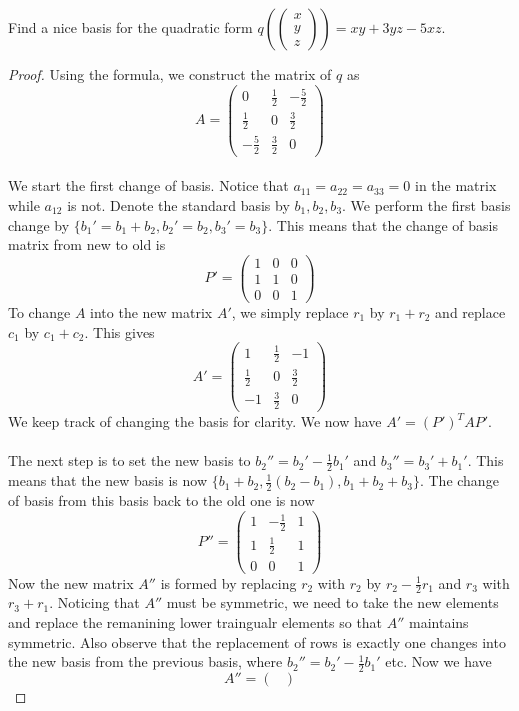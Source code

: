 \begin{eg}{}{} Find a nice basis for the quadratic form $q\left(\begin{pmatrix}x\\y\\z\end{pmatrix}\right)=xy+3yz-5xz$. \tcbline
\begin{proof}
Using the formula, we construct the matrix of $q$ as $$A=\begin{pmatrix}
0 & \frac{1}{2} & -\frac{5}{2}\\
\frac{1}{2} & 0 & \frac{3}{2}\\
-\frac{5}{2} & \frac{3}{2} & 0
\end{pmatrix}$$ ~\\
We start the first change of basis. Notice that $a_{11}=a_{22}=a_{33}=0$ in the matrix while $a_{12}$ is not. Denote the standard basis by $b_1,b_2,b_3$. We perform the first basis change by $\{b_1'=b_1+b_2,b_2'=b_2,b_3'=b_3\}$. This means that the change of basis matrix from new to old is $$P'=\begin{pmatrix}
1 & 0 & 0\\
1 & 1 & 0\\
0 & 0 & 1
\end{pmatrix}$$
To change $A$ into the new matrix $A'$, we simply replace $r_1$ by $r_1+r_2$ and replace $c_1$ by $c_1+c_2$. This gives $$A'=\begin{pmatrix}
1 & \frac{1}{2} & -1\\
\frac{1}{2} & 0 & \frac{3}{2}\\
-1 & \frac{3}{2} & 0
\end{pmatrix}$$
We keep track of changing the basis for clarity. We now have $A'=(P')^TAP'$. \\~\\
The next step is to set the new basis to $b_2''=b_2'-\frac{1}{2}b_1'$ and $b_3''=b_3'+b_1'$. This means that the new basis is now $\{b_1+b_2,\frac{1}{2}(b_2-b_1),b_1+b_2+b_3\}$. The change of basis from this basis back to the old one is now $$P''=\begin{pmatrix}
1 & -\frac{1}{2} & 1\\
1 & \frac{1}{2} & 1\\
0 & 0 & 1
\end{pmatrix}$$ Now the new matrix $A''$ is formed by replacing $r_2$ with $r_2$ by $r_2-\frac{1}{2}r_1$ and $r_3$ with $r_3+r_1$. Noticing that $A''$ must be symmetric, we need to take the new elements and replace the remanining lower traingualr elements so that $A''$ maintains symmetric. Also observe that the replacement of rows is exactly one changes into the new basis from the previous basis, where $b_2''=b_2'-\frac{1}{2}b_1'$ etc. Now we have $$A''=\begin{pmatrix}

\end{pmatrix}$$
\end{proof}
\end{eg}
